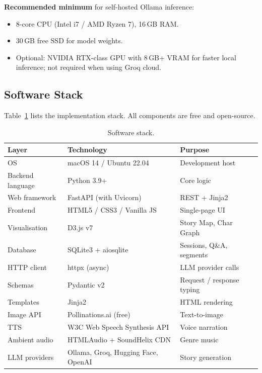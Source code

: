 \textbf{Recommended minimum} for self-hosted Ollama inference:
\begin{itemize}
    \item 8-core CPU (Intel i7 / AMD Ryzen 7), 16\,GB RAM.
    \item 30\,GB free SSD for model weights.
    \item Optional: NVIDIA RTX-class GPU with 8\,GB+ VRAM for faster
    local inference; not required when using Groq cloud.
\end{itemize}

\subsection{Software Stack}
Table~\ref{tab:stack} lists the implementation stack. All components
are free and open-source.

\begin{table}[!t]
\caption{Software stack.}
\label{tab:stack}
\centering
\renewcommand{\arraystretch}{1.15}
\begin{tabular}{@{}lll@{}}
\toprule
\textbf{Layer}   & \textbf{Technology}              & \textbf{Purpose} \\
\midrule
OS               & macOS 14 / Ubuntu 22.04          & Development host \\
Backend language & Python 3.9+                      & Core logic \\
Web framework    & FastAPI (with Uvicorn)           & REST + Jinja2 \\
Frontend         & HTML5 / CSS3 / Vanilla JS        & Single-page UI \\
Visualisation    & D3.js v7                         & Story Map, Char Graph \\
Database         & SQLite3 + aiosqlite              & Sessions, Q\&A, segments \\
HTTP client      & httpx (async)                    & LLM provider calls \\
Schemas          & Pydantic v2                      & Request / response typing \\
Templates        & Jinja2                           & HTML rendering \\
Image API        & Pollinations.ai (free)           & Text-to-image \\
TTS              & W3C Web Speech Synthesis API     & Voice narration \\
Ambient audio    & HTMLAudio + SoundHelix CDN       & Genre music \\
LLM providers    & Ollama, Groq, Hugging Face, OpenAI & Story generation \\
\bottomrule
\end{tabular}
\end{table}

